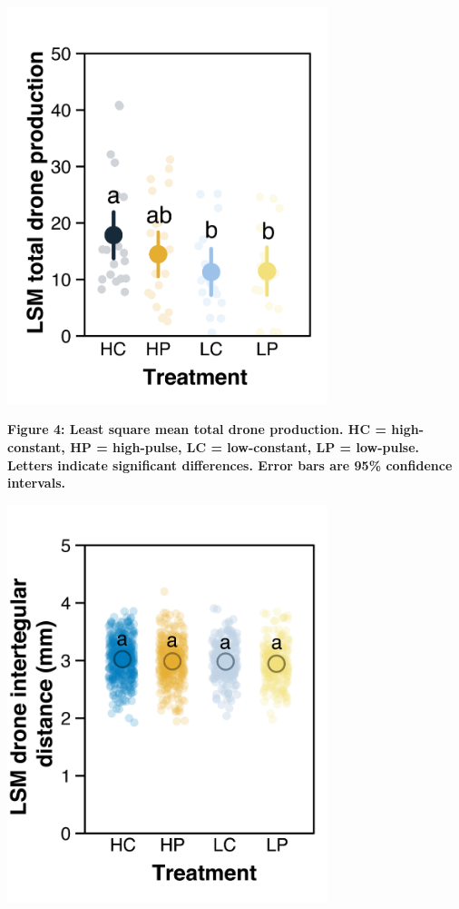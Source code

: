 \documentclass[11pt,]{article}
\begin{document}
\newpage

\includegraphics[width=0.7\textwidth,height=\textheight]{./ms_figs/fig4_mcdrones_v2.png}

\textbf{Figure 4: Least square mean total drone production. HC =
high-constant, HP = high-pulse, LC = low-constant, LP = low-pulse.
Letters indicate significant differences. Error bars are 95\% confidence
intervals.} \clearpage

\newpage

\includegraphics[width=0.7\textwidth,height=\textheight]{./ms_figs/fig5_mcdroneit_v2.png}
\end{document}
